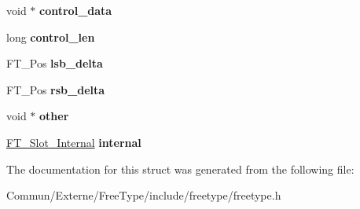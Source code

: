 \begin{DoxyCompactItemize}
\item 
void $\ast$ {\bfseries control\+\_\+data}\hypertarget{struct_f_t___glyph_slot_rec___a2af67814d985bcdfcffdf7e8a36ebbdf}{}\label{struct_f_t___glyph_slot_rec___a2af67814d985bcdfcffdf7e8a36ebbdf}

\item 
long {\bfseries control\+\_\+len}\hypertarget{struct_f_t___glyph_slot_rec___a7a088255cb09abe42f19f650f48b6b3f}{}\label{struct_f_t___glyph_slot_rec___a7a088255cb09abe42f19f650f48b6b3f}

\item 
F\+T\+\_\+\+Pos {\bfseries lsb\+\_\+delta}\hypertarget{struct_f_t___glyph_slot_rec___a7d0d8c2eda28e38541e953186ecab89a}{}\label{struct_f_t___glyph_slot_rec___a7d0d8c2eda28e38541e953186ecab89a}

\item 
F\+T\+\_\+\+Pos {\bfseries rsb\+\_\+delta}\hypertarget{struct_f_t___glyph_slot_rec___a2ca5f5e7b92df3aee4584949fa6a2a1c}{}\label{struct_f_t___glyph_slot_rec___a2ca5f5e7b92df3aee4584949fa6a2a1c}

\item 
void $\ast$ {\bfseries other}\hypertarget{struct_f_t___glyph_slot_rec___ad0c5ab51842f178ba571bab2874f1bdb}{}\label{struct_f_t___glyph_slot_rec___ad0c5ab51842f178ba571bab2874f1bdb}

\item 
\hyperlink{struct_f_t___slot___internal_rec__}{F\+T\+\_\+\+Slot\+\_\+\+Internal} {\bfseries internal}\hypertarget{struct_f_t___glyph_slot_rec___a91731fd527eeab1d1acf3e1aea4bea84}{}\label{struct_f_t___glyph_slot_rec___a91731fd527eeab1d1acf3e1aea4bea84}

\end{DoxyCompactItemize}


The documentation for this struct was generated from the following file\+:\begin{DoxyCompactItemize}
\item 
Commun/\+Externe/\+Free\+Type/include/freetype/freetype.\+h\end{DoxyCompactItemize}
